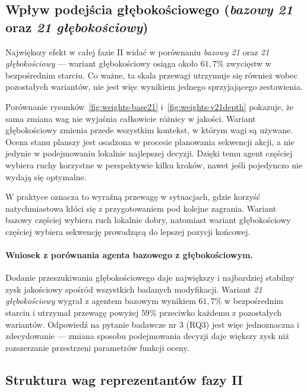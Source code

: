 \subsection{Wpływ podejścia głębokościowego (\textit{bazowy 21} oraz \textit{21 głębokościowy})}

Największy efekt w całej fazie II widać w porównaniu \textit{bazowy 21} oraz \textit{21 głębokościowy} --- wariant głębokościowy osiąga około \(61{,}7\%\) zwycięstw w bezpośrednim starciu. Co ważne, ta skala przewagi utrzymuje się również wobec pozostałych wariantów, nie jest więc wynikiem jednego sprzyjającego zestawienia.



Porównanie rysunków~\ref{fig:weights-base21} i~\ref{fig:weights-v21depth} pokazuje, że sama zmiana wag nie wyjaśnia całkowicie różnicy w jakości. Wariant głębokościowy zmienia przede wszystkim kontekst, w którym wagi są używane. Ocena stanu planszy jest osadzona w procesie planowania sekwencji akcji, a nie jedynie w podejmowaniu lokalnie najlepszej decyzji. Dzięki temu agent częściej wybiera ruchy korzystne w perspektywie kilku kroków, nawet jeśli pojedynczo nie wydają się optymalne.

W praktyce oznacza to wyraźną przewagę w sytuacjach, gdzie korzyść natychmiastowa kłóci się z przygotowaniem pod kolejne zagrania. Wariant bazowy częściej wybiera ruch lokalnie dobry, natomiast wariant głębokościowy częściej wybiera sekwencję prowadzącą do lepszej pozycji końcowej.

\paragraph{Wniosek z porównania agenta bazowego z głębokościowym.}
Dodanie przeszukiwania głębokościowego daje największy i najbardziej stabilny zysk jakościowy spośród wszystkich badanych modyfikacji. Wariant \textit{21 głębokościowy} wygrał z agentem bazowym wynikiem \(61{,}7\%\) w bezpośrednim starciu i utrzymał przewagę powyżej \(59\%\) przeciwko każdemu z pozostałych wariantów. Odpowiedź na pytanie badawcze nr 3 (RQ3) jest więc jednoznaczna i zdecydowanie --- zmiana sposobu podejmowania decyzji daje większy zysk niż rozszerzanie przestrzeni parametrów funkcji oceny.

\subsection{Struktura wag reprezentantów fazy II}

